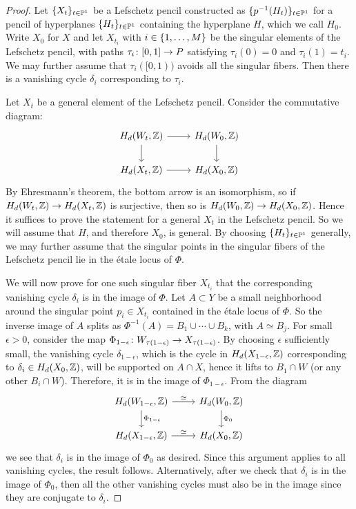 \begin{proof}
  Let $\lbrace X_t\rbrace_{t \in \mathbb{P}^1}$ be a Lefschetz pencil constructed as $\lbrace p^{-1}(H_t)\rbrace_{t \in \mathbb{P}^1}$ for a pencil of hyperplanes $\lbrace H_t\rbrace_{t \in \mathbb{P}^1}$ containing the hyperplane $H$, which we call $H_0$. Write $X_0$ for $X$ and let $X_{t_i}$ with $i \in \lbrace1,\dots,M\rbrace$ be the singular elements of the Lefschetz pencil, with paths $\tau_i \colon [0,1] \to P$ satisfying $\tau_i(0) = 0$ and $\tau_i(1) = t_i$. We may further assume that $\tau_i([0,1))$ avoids all the singular fibers. Then there is a vanishing cycle $\delta_i$ corresponding to $\tau_i$.
  
  Let $X_t$ be a general element of the Lefschetz pencil. Consider the commutative diagram:
\[
  \begin{tikzcd}
    H_d(W_t,\Z) \arrow[r] \arrow[d] & H_d(W_0,\Z) \arrow[d]\\
    H_d(X_t,\Z) \arrow[r] & H_d(X_0,\Z)
  \end{tikzcd}
\]
By Ehresmann's theorem, the bottom arrow is an isomorphism, so if $H_d(W_t, \mathbb{Z}) \to H_d(X_t,\mathbb{Z})$ is surjective, then so is $H_d(W_0, \mathbb{Z}) \to H_d(X_0,\mathbb{Z})$. Hence it suffices to prove the statement for a general $X_t$ in the Lefschetz pencil. So we will assume that $H$, and therefore $X_0$, is general. By choosing $\lbrace H_t\rbrace_{t \in \mathbb{P}^1}$ generally, we may further assume that the singular points in the singular fibers of the Lefschetz pencil lie in the \'etale locus of $\Phi$.

We will now prove for one such singular fiber $X_{t_i}$ that the corresponding vanishing cycle $\delta_i$ is in the image of $\Phi$. Let $A \subset Y$ be a small neighborhood around the singular point $p_i \in X_{t_i}$ contained in the \'etale locus of $\Phi$. So the inverse image of $A$ splits as $\Phi^{-1}(A) = B_1 \cup \cdots \cup B_k$, with $A \simeq B_j$. For small $\epsilon > 0$, consider the map $\Phi_{1-\epsilon} \colon W_{\tau(1-\epsilon)} \to X_{\tau(1-\epsilon)}$. By choosing $\epsilon$ sufficiently small, the vanishing cycle $\delta_{1-\epsilon}$, which is the cycle in $H_d(X_{1-\epsilon},\mathbb{Z})$ corresponding to $\delta_i \in H_d(X_0,\mathbb{Z})$, will be supported on $A \cap X$, hence it lifts to $B_1 \cap W$ (or any other $B_i \cap W$). Therefore, it is in the image of $\Phi_{1-\epsilon}$. From the diagram
\[
  \begin{tikzcd}
    H_d(W_{1-\epsilon},\Z) \arrow[r,"\simeq"] \arrow[d,"\Phi_{1-\epsilon}"] & H_d(W_0,\Z) \arrow[d,"\Phi_0"] \\
H_d(X_{1-\epsilon},\Z) \arrow[r,"\simeq"] & H_d(X_0,\Z)
  \end{tikzcd}
\]
we see that $\delta_i$ is in the image of $\Phi_0$ as desired. Since this argument applies to all vanishing cycles, the result follows. Alternatively, after we check that $\delta_i$ is in the image of $\Phi_0$, then all the other vanishing cycles must also be in the image since they are conjugate to $\delta_i$.
\end{proof}

